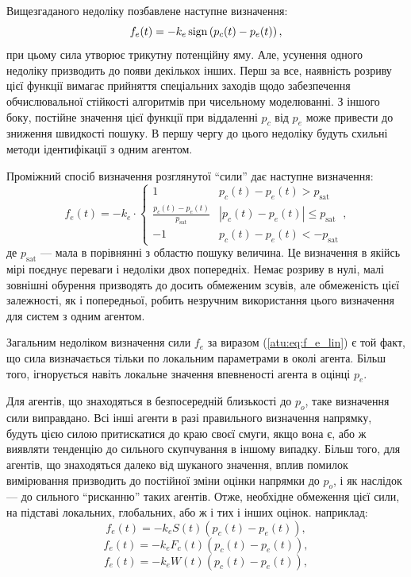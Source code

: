 Вищезгаданого недоліку позбавлене наступне визначення:
%
\begin{equation}
  f_e(t) = - k_e \operatorname*{sign} \left( p_c(t) - p_e(t) \right) ,
  \label{atu:eq:f_e_sign}
\end{equation}
%
при цьому сила утворює трикутну потенційну яму.
Але, усунення одного
недоліку призводить до появи декількох інших. Перш за все,
наявність розриву цієї функції вимагає прийняття спеціальних
заходів щодо забезпечення обчислювальної стійкості алгоритмів
при чисельному моделюванні. З іншого боку, постійне значення
цієї функції при віддаленні
$ p_c $ від
$ p_e $ може привести до зниження швидкості пошуку. В першу чергу
до цього недоліку будуть схильні методи ідентифікації з одним
агентом.

Проміжний спосіб визначення розглянутої ``сили'' дає наступне
визначення:
%
\begin{equation}
  f_e(t)
  = - k_e \cdot
  \begin{cases}
    1 &  p_c(t) - p_e(t)  > p_\mathrm{sat}
    \\
    \frac{p_c(t)-p_e(t)}{p_\mathrm{sat}} & | p_c(t)-p_e(t)| \le p_\mathrm{sat}
    \\
    -1 &  p_c(t) - p_e(t)  < -p_\mathrm{sat}
  \end{cases},
  \label{atu:eq:f_e_sat}
\end{equation}
%
де  $p_\mathrm{sat}$ ---
мала в порівнянні з областю пошуку величина. Це визначення в
якійсь мірі поєднує переваги і недоліки двох попередніх. Немає
розриву в нулі, малі зовнішні обурення призводять до досить
обмеженим зсувів, але обмеженість цієї залежності, як і
попередньої, робить незручним використання цього визначення
для систем з одним агентом.

Загальним недоліком визначення сили $f_e$ за виразом (\ref{atu:eq:f_e_lin})
є той факт, що сила визначається тільки по локальним параметрами в околі
агента. Більш того, ігнорується навіть локальне значення впевненості агента в
оцінці $p_e$.

Для агентів, що знаходяться в безпосередній близькості до
$ p_o $, таке визначення сили виправдано. Всі інші агенти в разі
правильного визначення напрямку, будуть цією силою притискатися
до краю своєї смуги, якщо вона є, або ж виявляти тенденцію до
сильного скупчування в іншому випадку. Більш того, для агентів,
що знаходяться далеко від шуканого значення, вплив помилок
вимірювання призводить до постійної зміни оцінки напрямки до
$ p_o $, і як наслідок --- до сильного ``рисканню'' таких агентів. Отже,
необхідне обмеження цієї сили, на підставі локальних,
глобальних, або ж і тих і інших оцінок. наприклад:
%
\begin{equation}
  f_e(t) = - k_e S(t) \left( p_c(t) - p_e(t) \right) ,
  \label{atu:eq:f_e_lin_S}
\end{equation}
%
\begin{equation}
  f_e(t) = - k_e F_c(t) \left( p_c(t) - p_e(t) \right) ,
  \label{atu:eq:f_e_lin_F}
\end{equation}
%
\begin{equation}
  f_e(t) = - k_e W(t) \left( p_c(t) - p_e(t) \right) ,
  \label{atu:eq:f_e_lin_W}
\end{equation}


